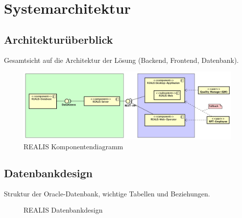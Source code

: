 \chapter{Systemarchitektur}

\section{Architekturüberblick}
Gesamtsicht auf die Architektur der Lösung (Backend, Frontend, Datenbank).

\begin{figure}[!h]
    \centering
    \includegraphics[width=1\textwidth]{bilder/REALIS-Komponentendiagramm.png}
    \caption{REALIS Komponentendiagramm}
    \label{fig:realis-komponentendiagramm}
\end{figure}

\section{Datenbankdesign}
Struktur der Oracle-Datenbank, wichtige Tabellen und Beziehungen.

\begin{figure}[!h]
    \centering
    \caption{REALIS Datenbankdesign}
    \label{fig:realis-datenbankdesign}
\end{figure}

